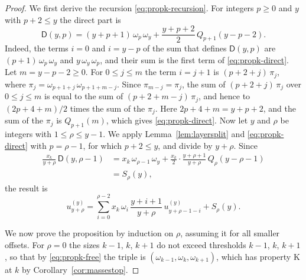 \documentclass{amsart}
\theoremstyle{definition}
\theoremstyle{remark}
\numberwithin{equation}{section}
\begin{document}
\begin{proof}
We first derive the recursion \eqref{eq:propk-recursion}. For integers
$p\ge0$ and $y$ with $p+2\le y$ the direct part is
\begin{equation}\label{eq:propk-direct}
\mathsf{D}(y,p)=(y+p+1)\,\omega_p\,\omega_y
+\frac{y+p+2}{2}\,Q_{p+1}(y-p-2) .
\end{equation}
Indeed, the terms $i=0$ and $i=y-p$ of the sum that defines
$\mathsf{D}(y,p)$ are $(p+1)\,\omega_p\,\omega_y$ and
$y\,\omega_y\,\omega_p$, and their sum is the first term of
\eqref{eq:propk-direct}. Let $m=y-p-2\ge0$. For $0\le j\le m$ the term
$i=j+1$ is $(p+2+j)\,\pi_j$, where
$\pi_j=\omega_{p+1+j}\,\omega_{p+1+m-j}$. Since $\pi_{m-j}=\pi_j$, the sum
of $(p+2+j)\,\pi_j$ over $0\le j\le m$ is equal to the sum of
$(p+2+m-j)\,\pi_j$, and hence to $(2p+4+m)/2$ times the sum of
the $\pi_j$. Here $2p+4+m=y+p+2$, and the sum of the $\pi_j$ is
$Q_{p+1}(m)$, which gives \eqref{eq:propk-direct}. Now let $y$ and $\rho$
be integers with $1\le\rho\le y-1$. We apply Lemma~\ref{lem:layersplit} and
\eqref{eq:propk-direct} with $p=\rho-1$, for which $p+2\le y$, and divide
by $y+\rho$. Since
\begin{align*}
\frac{x_k}{y+\rho}\,\mathsf{D}(y,\rho-1)
&=x_k\,\omega_{\rho-1}\,\omega_y
+\frac{x_k}{2}\cdot\frac{y+\rho+1}{y+\rho}\,Q_\rho(y-\rho-1)\\
&=S_\rho(y),
\end{align*}
the result is
\begin{equation}\label{eq:propk-recursion}
u^{(y)}_{y+\rho}=\sum_{i=0}^{\rho-2}x_k\,\omega_i\,\frac{y+i+1}{y+\rho}\,
u^{(y)}_{y+\rho-1-i}+S_\rho(y).
\end{equation}

We now prove the proposition by induction on $\rho$, assuming it for all
smaller offsets. For $\rho=0$ the sizes $k-1$, $k$, $k+1$ do not exceed
thresholds $k-1$, $k$, $k+1$, so that by \eqref{eq:propk-free} the
triple is $(\omega_{k-1},\omega_k,\omega_{k+1})$, which has property K at
$k$ by Corollary~\ref{cor:massestop}.


\end{proof}
\end{document}
